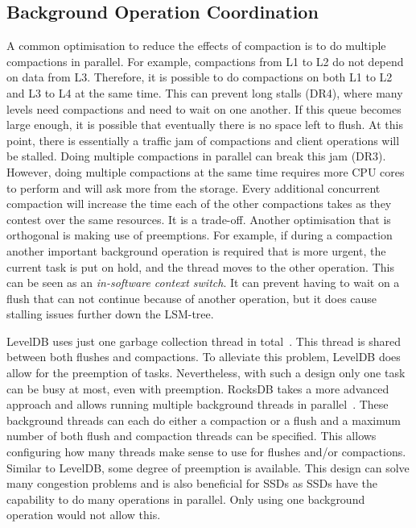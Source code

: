 \subsection{Background Operation Coordination}
A common optimisation to reduce the effects of compaction is to do multiple compactions in parallel. For example, compactions from L1 to L2 do not depend on data from L3. Therefore, it is possible to do compactions on both L1 to L2 and L3 to L4 at the same time. This can prevent long stalls (DR4), where many levels need compactions and need to wait on one another. If this queue becomes large enough, it is possible that eventually there is no space left to flush. At this point, there is essentially a traffic jam of compactions and client operations will be stalled. Doing multiple compactions in parallel can break this jam (DR3). However, doing multiple compactions at the same time requires more CPU cores to perform and will ask more from the storage. Every additional concurrent compaction will increase the time each of the other compactions takes as they contest over the same resources. It is a trade-off. Another optimisation that is orthogonal is making use of preemptions. For example, if during a compaction another important background operation is required that is more urgent, the current task is put on hold, and the thread moves to the other operation. This can be seen as an \textit{in-software context switch}. It can prevent having to wait on a flush that can not continue because of another operation, but it does cause stalling issues further down the LSM-tree. 

LevelDB uses just one garbage collection thread in total~\cite{zhang2017flashkv}. This thread is shared between both flushes and compactions. To alleviate this problem, LevelDB does allow for the preemption of tasks. Nevertheless, with such a design only one task can be busy at most, even with preemption. RocksDB takes a more advanced approach and allows running multiple background threads in parallel~\cite{kannan2018redesigning, balmau2019silk}. These background threads can each do either a compaction or a flush and a maximum number of both flush and compaction threads can be specified. This allows configuring how many threads make sense to use for flushes and/or compactions. Similar to LevelDB, some degree of preemption is available. This design can solve many congestion problems and is also beneficial for SSDs as SSDs have the capability to do many operations in parallel. Only using one background operation would not allow this.

